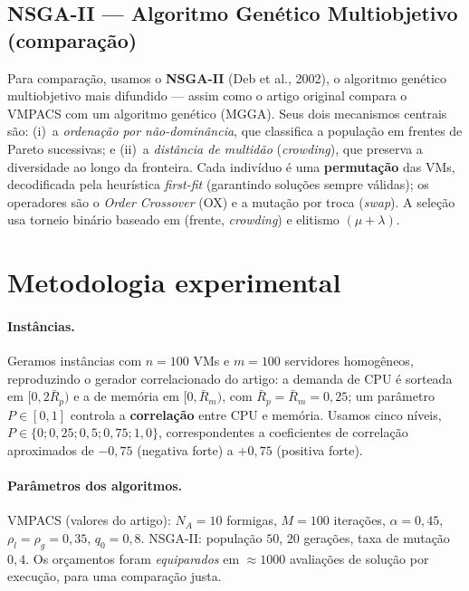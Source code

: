 \documentclass[11pt]{article}
\begin{document}
\subsection{NSGA-II --- Algoritmo Genético Multiobjetivo (comparação)}
Para comparação, usamos o \textbf{NSGA-II} (Deb et al., 2002), o algoritmo
genético multiobjetivo mais difundido --- assim como o artigo original compara o
VMPACS com um algoritmo genético (MGGA). Seus dois mecanismos centrais são:
(i)~a \emph{ordenação por não-dominância}, que classifica a população em frentes
de Pareto sucessivas; e (ii)~a \emph{distância de multidão} (\emph{crowding}),
que preserva a diversidade ao longo da fronteira. Cada indivíduo é uma
\textbf{permutação} das VMs, decodificada pela heurística \emph{first-fit}
(garantindo soluções sempre válidas); os operadores são o \emph{Order Crossover}
(OX) e a mutação por troca (\emph{swap}). A seleção usa torneio binário baseado em
(frente, \emph{crowding}) e elitismo $(\mu+\lambda)$.

\section{Metodologia experimental}
\paragraph{Instâncias.} Geramos instâncias com $n=100$ VMs e $m=100$ servidores
homogêneos, reproduzindo o gerador correlacionado do artigo: a demanda de CPU é
sorteada em $[0,2\bar{R}_p)$ e a de memória em $[0,\bar{R}_m)$, com
$\bar{R}_p=\bar{R}_m=0{,}25$; um parâmetro $P\in[0,1]$ controla a
\textbf{correlação} entre CPU e memória. Usamos cinco níveis,
$P\in\{0;0{,}25;0{,}5;0{,}75;1{,}0\}$, correspondentes a coeficientes de
correlação aproximados de $-0{,}75$ (negativa forte) a $+0{,}75$ (positiva forte).

\paragraph{Parâmetros dos algoritmos.} VMPACS (valores do artigo): $N_A=10$
formigas, $M=100$ iterações, $\alpha=0{,}45$, $\rho_l=\rho_g=0{,}35$, $q_0=0{,}8$.
NSGA-II: população $50$, $20$ gerações, taxa de mutação $0{,}4$. Os orçamentos
foram \emph{equiparados} em $\approx\!1000$ avaliações de solução por execução,
para uma comparação justa.
\end{document}
